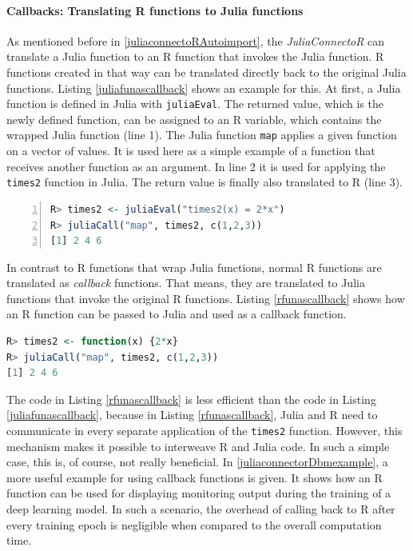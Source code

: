 \documentclass[12pt]{article}
\newcommand{\inlinecode}[1]{\texttt{#1}}
\newcommand{\apkg}[1]{\emph{#1}}
\begin{document}
\paragraph{Callbacks: Translating R functions to Julia functions}\label{juliaconnectorcallbacks}

As mentioned before in \ref{juliaconnectoRAutoimport}, the \apkg{JuliaConnectoR} can translate a Julia function to an R function that invokes the Julia function.
R functions created in that way can be translated directly back to the original Julia functions.
Listing \ref{juliafunascallback} shows an example for this.
At first, a Julia function is defined in Julia with \inlinecode{juliaEval}.
The returned value, which is the newly defined function, can be assigned to an R variable, which contains the wrapped Julia function (line 1).
The Julia function \inlinecode{map} applies a given function on a vector of values.
It is used here as a simple example of a function that receives another function as an argument.
In line 2 it is used for applying the \inlinecode{times2} function in Julia.
The return value is finally also translated to R (line 3). 

\begin{lstlisting}[language=R, float =!h, caption={Passing a reference to a Julia function back to Julia},label={juliafunascallback}, numbers=left]
R> times2 <- juliaEval("times2(x) = 2*x")
R> juliaCall("map", times2, c(1,2,3))
[1] 2 4 6
\end{lstlisting}

In contrast to R functions that wrap Julia functions, normal R functions are translated as {\em callback} functions.
That means, they are translated to Julia functions that invoke the original R functions.
Listing \ref{rfunascallback} shows how an R function can be passed to Julia and used as a callback function.

\begin{lstlisting}[language=R, float =!h, caption={An R function used as a callback function}, label={rfunascallback}]
R> times2 <- function(x) {2*x}
R> juliaCall("map", times2, c(1,2,3))
[1] 2 4 6
\end{lstlisting}

The code in Listing \ref{rfunascallback} is less efficient than the code in Listing \ref{juliafunascallback}, because in Listing \ref{rfunascallback}, Julia and R need to communicate in every separate application of the \inlinecode{times2} function.
However, this mechanism makes it possible to interweave R and Julia code.
In such a simple case, this is, of course, not really beneficial.
In \ref{juliaconnectorDbmexample}, a more useful example for using callback functions is given.
It shows how an R function can be used for displaying monitoring output during the training of a deep learning model.
In such a scenario, the overhead of calling back to R after every training epoch is negligible when compared to the overall computation time.
\end{document}
